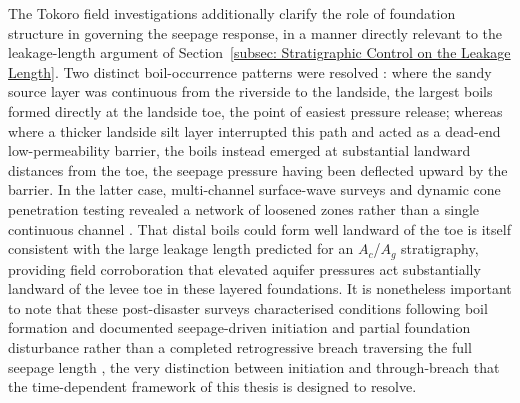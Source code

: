 The Tokoro field investigations additionally clarify the role of foundation structure in governing the seepage response, in a manner directly relevant to the leakage-length argument of Section~\ref{subsec: Stratigraphic Control on the Leakage Length}. Two distinct boil-occurrence patterns were resolved \parencite{kawajiri_2025, morita_2018}: where the sandy source layer was continuous from the riverside to the landside, the largest boils formed directly at the landside toe, the point of easiest pressure release; whereas where a thicker landside silt layer interrupted this path and acted as a dead-end low-permeability barrier, the boils instead emerged at substantial landward distances from the toe, the seepage pressure having been deflected upward by the barrier. In the latter case, multi-channel surface-wave surveys and dynamic cone penetration testing revealed a network of loosened zones rather than a single continuous channel \parencite{kawajiri_2025}. That distal boils could form well landward of the toe is itself consistent with the large leakage length predicted for an $A_c$/$A_g$ stratigraphy, providing field corroboration that elevated aquifer pressures act substantially landward of the levee toe in these layered foundations. It is nonetheless important to note that these post-disaster surveys characterised conditions following boil formation and documented seepage-driven initiation and partial foundation disturbance rather than a completed retrogressive breach traversing the full seepage length \parencite{kawajiri_2025}, the very distinction between initiation and through-breach that the time-dependent framework of this thesis is designed to resolve.

